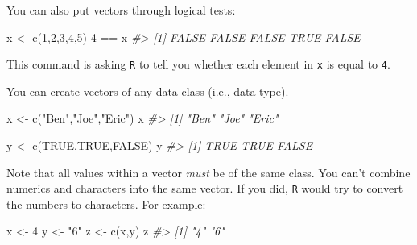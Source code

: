 \documentclass[
]{book}
\newenvironment{Shaded}{\begin{snugshade}}{\end{snugshade}}
\newcommand{\CommentTok}[1]{\textcolor[rgb]{0.56,0.35,0.01}{\textit{#1}}}
\newcommand{\ConstantTok}[1]{\textcolor[rgb]{0.00,0.00,0.00}{#1}}
\newcommand{\DecValTok}[1]{\textcolor[rgb]{0.00,0.00,0.81}{#1}}
\newcommand{\FunctionTok}[1]{\textcolor[rgb]{0.00,0.00,0.00}{#1}}
\newcommand{\NormalTok}[1]{#1}
\newcommand{\OtherTok}[1]{\textcolor[rgb]{0.56,0.35,0.01}{#1}}
\newcommand{\SpecialCharTok}[1]{\textcolor[rgb]{0.00,0.00,0.00}{#1}}
\newcommand{\StringTok}[1]{\textcolor[rgb]{0.31,0.60,0.02}{#1}}
\begin{document}
You can also put vectors through logical tests:

\begin{Shaded}
\begin{Highlighting}[]
\NormalTok{x }\OtherTok{\textless{}{-}} \FunctionTok{c}\NormalTok{(}\DecValTok{1}\NormalTok{,}\DecValTok{2}\NormalTok{,}\DecValTok{3}\NormalTok{,}\DecValTok{4}\NormalTok{,}\DecValTok{5}\NormalTok{)}
\DecValTok{4} \SpecialCharTok{==}\NormalTok{ x}
\CommentTok{\#\textgreater{} [1] FALSE FALSE FALSE  TRUE FALSE}
\end{Highlighting}
\end{Shaded}

This command is asking \texttt{R} to tell you whether each element in \texttt{x} is equal to \texttt{4}.

You can create vectors of any data class (i.e., data type).

\begin{Shaded}
\begin{Highlighting}[]
\NormalTok{x }\OtherTok{\textless{}{-}} \FunctionTok{c}\NormalTok{(}\StringTok{"Ben"}\NormalTok{,}\StringTok{"Joe"}\NormalTok{,}\StringTok{"Eric"}\NormalTok{) }
\NormalTok{x}
\CommentTok{\#\textgreater{} [1] "Ben"  "Joe"  "Eric"}
\end{Highlighting}
\end{Shaded}

\begin{Shaded}
\begin{Highlighting}[]
\NormalTok{y }\OtherTok{\textless{}{-}} \FunctionTok{c}\NormalTok{(}\ConstantTok{TRUE}\NormalTok{,}\ConstantTok{TRUE}\NormalTok{,}\ConstantTok{FALSE}\NormalTok{)}
\NormalTok{y}
\CommentTok{\#\textgreater{} [1]  TRUE  TRUE FALSE}
\end{Highlighting}
\end{Shaded}

Note that all values within a vector \emph{must} be of the same class. You can't combine numerics and characters into the same vector. If you did, \texttt{R} would try to convert the numbers to characters. For example:

\begin{Shaded}
\begin{Highlighting}[]
\NormalTok{x }\OtherTok{\textless{}{-}} \DecValTok{4}
\NormalTok{y }\OtherTok{\textless{}{-}} \StringTok{"6"}
\NormalTok{z }\OtherTok{\textless{}{-}} \FunctionTok{c}\NormalTok{(x,y)}
\NormalTok{z}
\CommentTok{\#\textgreater{} [1] "4" "6"}
\end{Highlighting}
\end{Shaded}
\end{document}
